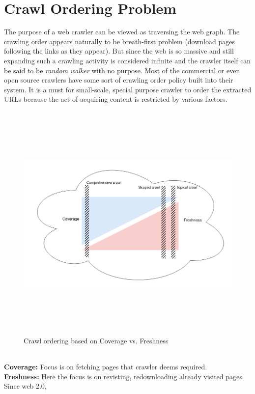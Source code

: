 

\section{Crawl Ordering Problem}
The purpose of a web crawler can be viewed as traversing the web graph. The crawling order appears naturally
to be breath-first problem (download pages following the links as they appear). But since the web is so
massive and still expanding such a crawling activity is considered infinite and the crawler itself can
be said to be \textit{random walker} with no purpose. Most of the commercial or even open source crawlers
have some sort of crawling order policy built into their system. It is a must for small-scale, special
purpose crawler to order the extracted URLs because the act of acquiring content is restricted by various
factors.
\begin{figure}[h!]
  \centering
  \includegraphics[width=15cm,height=12cm,keepaspectratio]{../media/crawler/crawl-ordering.png}
  \caption{Crawl ordering based on Coverage vs. Freshness}
  \label{fig:crawlorder}
\end{figure}
\leavemode \\
\textbf{Coverage:} Focus is on fetching pages that crawler deems required. 
\\
\textbf{Freshness:} Here the focus is on revisting, redownloading already visited pages. Since web 2.0,
